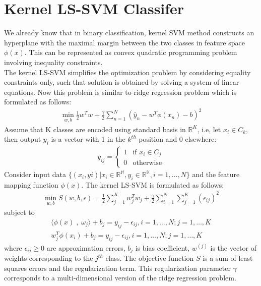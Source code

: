 \documentclass[conference]{IEEEtran}
\begin{document}
    \section{Kernel LS-SVM Classifer}
    We already know that in binary classification, kernel SVM method constructs an hyperplane with the maximal margin
    between the two classes in feature space $ \phi(x) $.
    This can be represented as convex quadratic programming problem
    involving inequality constraints. \\
    The kernel LS-SVM simplifies the optimization problem by
    considering equality constraints only, such that solution is obtained by solving a system of linear equations.
    Now this problem is similar to ridge regression problem which is formulated as follows:
    \begin{align}
        \min_{w,b} \frac{1}{2}w^{T}w + \frac{\gamma}{2}\sum_{n=1}^{N}(\hat{y}_{n} - w^{T}\phi(x_{n}) - b)^{2}
    \end{align}
    Assume that K classes are encoded using standard basis in $\mathbb{R}^{K}$, i.e, let $x_{i} \in C_{k}$, then output
    $ y_{i}$ is a vector with 1 in the $k^{th}$ position and 0 elsewhere:
    \begin{align}
       y_{ij} = \begin{cases}
            1 & \text{if } x_{i} \in C_{j} \\
            0 & \text{otherwise}
        \end{cases}
    \end{align}
    Consider input data $\{(x_{i},y{i}) | x_{i}\in\mathbb{R^{M}},y_{i}\in\mathbb{R^{K}}, i = 1,\ldots,N\}$ and the
    feature mapping function $\phi(x)$. The kernel LS-SVM is formulated as follows:
    \begin{align}
        \min_{w,b} S(w,b,\epsilon) = \frac{1}{2}\sum_{j=1}^{K}w_{j}^{T}w_{j} + \frac{\gamma}{2}\sum_{i=1}^{N}\sum_{j=1}^{K}(\epsilon_{ij})^{2}
    \end{align}
    subject to
    \begin{align}
        \langle \phi(x) \;,\; \omega_{j}  \rangle + b_{j} = y_{ij} - \epsilon_{ij}, i = 1,\ldots,N; j = 1,\ldots,K \\
     w_{j}^{T}\phi(x_{i}) + b_{j} = y_{ij} - \epsilon_{ij} , i = 1,\ldots,N; j = 1,\ldots,K
    \end{align}
    where $\epsilon_{ij} \geq 0$ are approximation errors, $b_{j}$ is bias coefficient, $w^{(j)}$ is the vector of
    weights corresponding to the $j^{th}$ class. The objective function $S$ is a sum of least squares errors and the
    regularization term. This regularization parameter $\gamma$ corresponds to a multi-dimensional version of the ridge
    regression problem.
\end{document}
